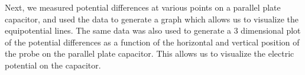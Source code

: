 \documentclass[letterpaper]{article}
\begin{document}
Next, we measured potential differences at various points on a parallel plate capacitor, and used the data to generate
a graph which allows us to visualize the equipotential lines. The same data was also used to generate a 3 dimensional
plot of the potential differences as a function of the horizontal and vertical position of the probe on the parallel plate
capacitor. This allows us to visualize the electric potential on the capacitor.

\end{document}
